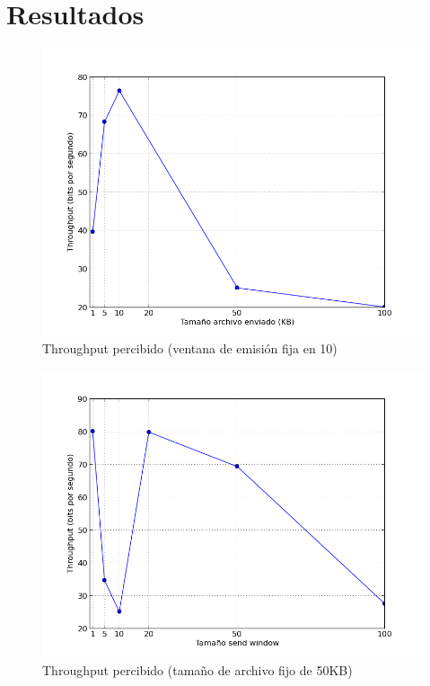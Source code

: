 \section{Resultados}

\begin{figure}[H]
\begin{center}
\includegraphics[width=\textwidth,keepaspectratio]{throughput.png}
\end{center}
\caption{Throughput percibido (ventana de emisión fija en 10)} \label{figura1}
\end{figure}

\begin{figure}[H]
\begin{center}
\includegraphics[width=\textwidth,keepaspectratio]{throughput50.png}
\end{center}
\caption{Throughput percibido (tamaño de archivo fijo de 50KB)} \label{figura3}
\end{figure}

